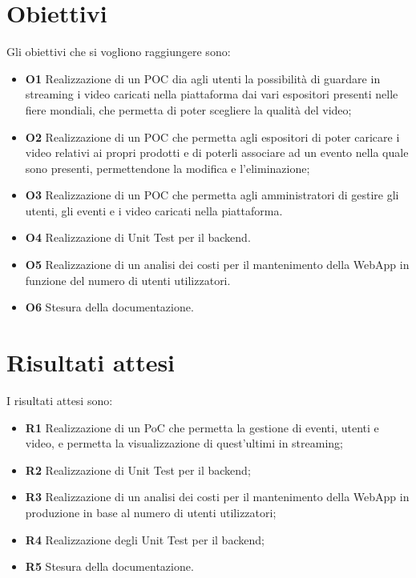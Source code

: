 \section{Obiettivi}
\label{sec:obiettivi}
Gli obiettivi che si vogliono raggiungere sono:
\begin{itemize}
    \item \textbf{O1} Realizzazione di un POC dia agli utenti la possibilità di guardare in streaming i video caricati nella piattaforma dai vari espositori presenti nelle fiere mondiali, che permetta di poter scegliere la qualità del video;
    \item \textbf{O2} Realizzazione di un POC che permetta agli espositori di poter caricare i video relativi ai propri prodotti e di poterli associare ad un evento nella quale sono presenti, permettendone la modifica e l'eliminazione;
    \item \textbf{O3} Realizzazione di un POC che permetta agli amministratori di gestire gli utenti, gli eventi e i video caricati nella piattaforma.
    \item \textbf{O4} Realizzazione di Unit Test per il backend.
    \item \textbf{O5} Realizzazione di un analisi dei costi per il mantenimento della WebApp in funzione del numero di utenti utilizzatori.
    \item \textbf{O6} Stesura della documentazione.
\end{itemize}
\section{Risultati attesi}
\label{sec:risultati-attesi}
I risultati attesi sono:
\begin{itemize}
    \item \textbf{R1} Realizzazione di un PoC che permetta la gestione di eventi, utenti e video, e permetta la visualizzazione di quest'ultimi in streaming;
    \item \textbf{R2} Realizzazione di Unit Test per il backend;
    \item \textbf{R3} Realizzazione di un analisi dei costi per il mantenimento della WebApp in produzione in base al numero di utenti utilizzatori;
    \item \textbf{R4} Realizzazione degli Unit Test per il backend;
    \item \textbf{R5} Stesura della documentazione.
\end{itemize}

